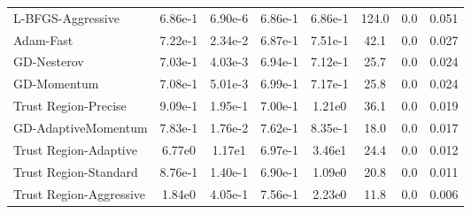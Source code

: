 \documentclass{article}
\begin{document}
\begin{table}[htbp]
{\begin{tabular}{p{2.5cm}*{7}{c}}
L-BFGS-Aggressive & 6.86e-1 & 6.90e-6 & 6.86e-1 & 6.86e-1 & 124.0 & 0.0 & 0.051 \\
Adam-Fast & 7.22e-1 & 2.34e-2 & 6.87e-1 & 7.51e-1 & 42.1 & 0.0 & 0.027 \\
GD-Nesterov & 7.03e-1 & 4.03e-3 & 6.94e-1 & 7.12e-1 & 25.7 & 0.0 & 0.024 \\
GD-Momentum & 7.08e-1 & 5.01e-3 & 6.99e-1 & 7.17e-1 & 25.8 & 0.0 & 0.024 \\
Trust Region-Precise & 9.09e-1 & 1.95e-1 & 7.00e-1 & 1.21e0 & 36.1 & 0.0 & 0.019 \\
GD-AdaptiveMomentum & 7.83e-1 & 1.76e-2 & 7.62e-1 & 8.35e-1 & 18.0 & 0.0 & 0.017 \\
Trust Region-Adaptive & 6.77e0 & 1.17e1 & 6.97e-1 & 3.46e1 & 24.4 & 0.0 & 0.012 \\
Trust Region-Standard & 8.76e-1 & 1.40e-1 & 6.90e-1 & 1.09e0 & 20.8 & 0.0 & 0.011 \\
Trust Region-Aggressive & 1.84e0 & 4.05e-1 & 7.56e-1 & 2.23e0 & 11.8 & 0.0 & 0.006 \\
\bottomrule
\end{tabular}
}
\end{table}
\end{document}
